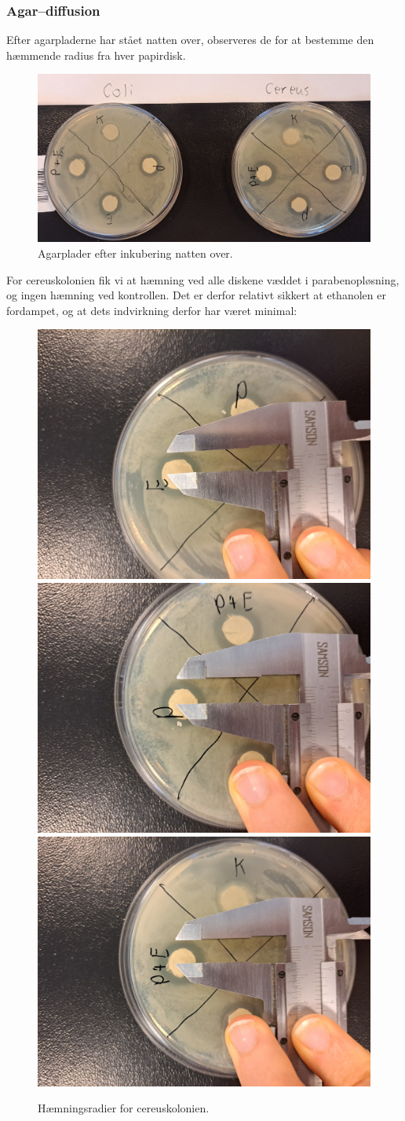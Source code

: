     \subsubsection{Agar--diffusion}
    Efter agarpladerne har stået natten over, observeres de for at bestemme den hæmmende radius fra hver papirdisk.
    \begin{figure}[H]\centering
        \includegraphics[width=\textwidth]{billeder/agar2}
        \caption{Agarplader efter inkubering natten over.}
    \end{figure}
    For cereuskolonien fik vi at hæmning ved alle diskene væddet i parabenopløsning, og ingen hæmning ved kontrollen. Det er derfor relativt sikkert at ethanolen er fordampet, og at dets indvirkning derfor har været minimal:
    \begin{figure}[H]\centering
        \includegraphics[width=.32\textwidth]{billeder/cereuse}
        \includegraphics[width=.32\textwidth]{billeder/cereusp}
        \includegraphics[width=.32\textwidth]{billeder/cereuspe}
        \caption{Hæmningsradier for cereuskolonien.}
    \end{figure}
